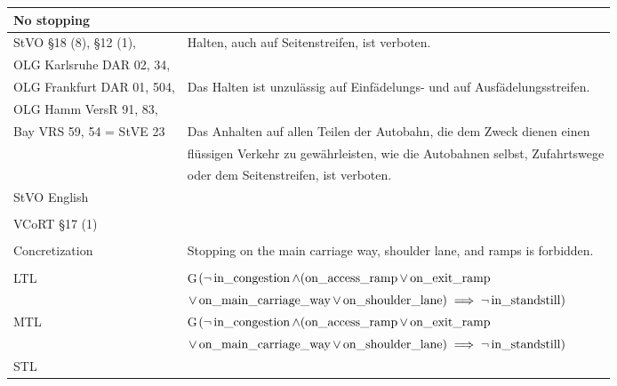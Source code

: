 \begin{table}[H]
	\centering
	\begin{tabular}[t]{ll}
		\toprule
		\textbf{No stopping} & \\
		\midrule
		StVO \S 18 (8), \S 12 (1), & Halten, auch auf Seitenstreifen, ist verboten.\\
		OLG Karlsruhe DAR 02, 34,& \\
		OLG Frankfurt DAR 01, 504, & Das Halten ist unzulässig auf Einfädelungs- und auf Ausfädelungsstreifen.\\
		OLG Hamm VersR 91, 83, & \\
		Bay VRS 59, 54 = StVE 23 & Das Anhalten auf allen Teilen der Autobahn, die dem Zweck dienen einen \\
		 & flüssigen Verkehr zu gewährleisten, wie die Autobahnen selbst, Zufahrtswege \\
		 & oder dem Seitenstreifen, ist verboten. \\
		StVO English & \\
		&\\
		VCoRT \S 17 (1) &  \\
		&\\
		Concretization & Stopping on the main carriage way, shoulder lane, and ramps is forbidden.  \\
		&\\
		LTL & G$(\neg \operatorname*{in\_congestion} \land (\operatorname*{on\_access\_ramp} \lor \operatorname*{on\_exit\_ramp} $ \\
		& $\lor \operatorname*{on\_main\_carriage\_way} \lor \operatorname*{on\_shoulder\_lane}) \implies \neg \operatorname*{in\_standstill})$\\
		MTL & G$(\neg \operatorname*{in\_congestion} \land (\operatorname*{on\_access\_ramp} \lor \operatorname*{on\_exit\_ramp} $ \\
		& $\lor \operatorname*{on\_main\_carriage\_way} \lor \operatorname*{on\_shoulder\_lane}) \implies \neg \operatorname*{in\_standstill})$\\
		STL & \\
		\bottomrule
	\end{tabular}
\end{table}%

